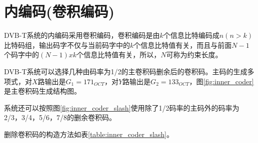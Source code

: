 	\section{内编码(卷积编码)}
		\par DVB-T系统的内编码采用卷积编码，卷积编码是由$k$个信息比特编码成$n(n>k)$比特码组，输出码字不仅与当前码字中的$k$个信息比特值有关，而且与前面$N-1$个码字中的$(N-1)xk$个信息比特值有关，所以，$N$可称为约束长度。
		\par DVB-T系统可以选择几种由码率为1/2的主卷积码删余后的卷积码。主码的生成多项式，对$X$路输出是$G_1=171_{OCT}$，对$Y$路输出是$G_2=133_{OCT}$，图\ref{fig:inner_coder}是主卷积码生成结构图。
		
		\par 系统还可以按照图\ref{fig:inner_coder_slash}使用除了1/2码率的主码外的码率为2/3，3/4，5/6，7/8的删余卷积码。
		
		\par 删除卷积码的构造方法如表\ref{table:inner_coder_slash}。
		
